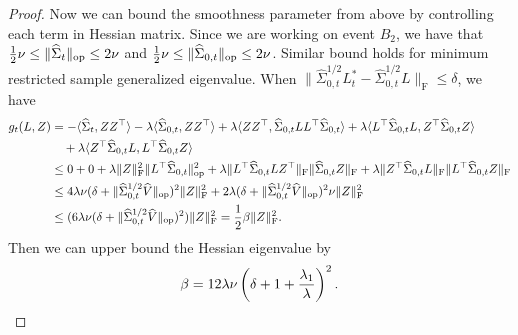 \documentclass[11pt]{article}
\newcommand{\nb}[1]{\textcolor{orange}{\texttt{[#1]}}}
\newcommand{\rev}[1]{\textcolor{black}{#1}}
\newcommand{\sot}{\widehat{\Sigma}_{0,t}}
\newcommand{\0}{{\mathbf{0}}}
\newcommand{\op}{{\mathrm{op}}}
\begin{document}
\begin{proof}
Now we can bound the smoothness parameter from above by controlling each term in Hessian matrix.  
Since we are working on event $B_2$, we have that
$\frac{1}{2}\rev{\nu}\leq\|\widehat{\Sigma}_t\|_\op\leq 2\rev{\nu}$ and $\frac{1}{2}\rev{\nu}\leq\|\sot\|_\op\leq2\rev{\nu}$. 
Similar bound holds for minimum restricted sample generalized eigenvalue. 
When $\|\sot^{1/2}L^*_t-\sot^{1/2} L\|_\mathrm{F}\leq \delta$,
we have
\begin{align*}
g_t(L,Z) & =
-\langle \widehat{\Sigma}_t,ZZ^\top  \rangle-\lambda\langle \sot,ZZ^\top  \rangle +\lambda\langle ZZ^\top  ,\sot LL^\top  \sot\rangle +\lambda\langle L^\top  \sot L,Z^\top  \sot Z\rangle\\
&~~~+\lambda\langle Z^\top \sot L, L^\top\sot Z \rangle \\
& \leq 0+0+\lambda\|Z\|_\mathrm{F}^2\|L^\top  \sot\|_{\op}^2 
+\lambda\|L^\top\sot LZ^\top\|_{\mathrm{F}}\|\sot Z \|_{\mathrm{F}}+\lambda \|Z^\top\sot L\|_\mathrm{F}\|L^\top\sot Z\|_\mathrm{F}\\ 
& \leq 4\lambda\rev{\nu}(\delta+\|\sot^{1/2}\widehat{V}\|_{\op} 
)^2\|Z\|_\mathrm{F}^2+2\lambda (\delta+\|\sot^{1/2}\widehat{V}\|_{\op})^2\rev{\nu}\|Z\|_\mathrm{F}^2
\\
& \leq (6\lambda\rev{\nu}(\delta+\|\sot^{1/2}\widehat{V}\|_{\op})^2)\|Z\|_\mathrm{F}^2=\frac{1}{2}\beta \|Z\|_\mathrm{F}^2.
\end{align*}
 Then we can upper bound the Hessian eigenvalue by
\begin{equation*}
    \beta=12\lambda\rev{\nu}\left(\delta+1+\frac{\lambda_1}{\lambda}\right)^2.
\end{equation*}


\end{proof}
\end{document}
